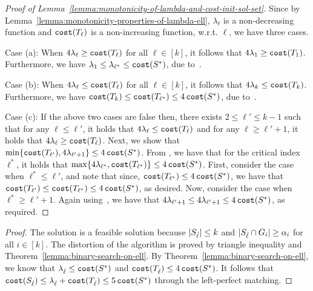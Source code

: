 \monotonicityoflambdacost*
\begin{proof}[Proof of Lemma~\ref{lemma:monotonicity-of-lambda-and-cost-init-sol-set}]
    Since by Lemma~\ref{lemma:monotonicity-properties-of-lambda-ell}, $\lambda_{\ell}$ is a non-de\-creas\-ing function and $\texttt{cost}(T_{\ell})$ is a non-increasing function, w.r.t. $\ell$, we have three cases.
    
    Case (a): When $4 \lambda_{\ell} \geq \texttt{cost}(T_{\ell})$ for all $\ell \in [k]$, it follows that $4 \lambda_{1} \geq \texttt{cost}(T_{1})$.
    Furthermore, we have $\lambda_1 \le \lambda_{\ell^*} \le  \texttt{cost}(S^*)$, due to~.

    Case (b): When $4 \lambda_{\ell} \leq \texttt{cost}(T_{\ell})$ for all $\ell \in [k]$, it follows that $4 \lambda_{k} \leq \texttt{cost}(T_{k})$. 
    Furthermore, we have $\texttt{cost}(T_{k}) \leq \texttt{cost}(T_{\ell^*}) \leq 4\,\texttt{cost}(S^*)$,  due to~.

    Case (c): If the above two cases are false then, there exists $2 \leq \ell' \leq k-1$ such that for any $\ell \leq \ell'$, it holds that $4 \lambda_{\ell} \leq \texttt{cost}(T_{\ell})$ and for any $\ell \geq \ell' + 1$, it holds that $4 \lambda_{\ell} \geq \texttt{cost}(T_{\ell})$.
    Next, we show that $\min \{\texttt{cost}(T_{\ell'}), 4 \lambda_{\ell' + 1}\} \leq 4\,\texttt{cost}(S^*)$. From , we have that for the critical index $\ell^*$, it holds that $\max\{4\lambda_{\ell^*}, \texttt{cost}(T_{\ell^*})\}\leq 4\, \texttt{cost}(S^*)$. First, consider the case when $\ell^* \le \ell'$, and note that since, $ \texttt{cost}(T_{\ell^*}) \leq 4\, \texttt{cost}(S^*)$, we have that $\texttt{cost}(T_{\ell'}) \le  \texttt{cost}(T_{\ell^*})\leq 4\, \texttt{cost}(S^*)$, as desired. Now, consider the case when $\ell^* \geq \ell'+1$. Again using~, we have that $4\lambda_{\ell'+1} \leq 4\lambda_{\ell'+1} \leq 4\, \texttt{cost}(S^*)$, as required.
\end{proof}

\getfeasiblesolution*
\begin{proof}
    The solution is a feasible solution because $\lvert S_{\hat{\ell}} \rvert  \leq k$ and $\lvert S_{\hat{\ell}} \cap G_i \rvert  \geq \alpha_i$ for all $i \in [k]$.
    The distortion of the algorithm is proved by triangle inequality and Theorem~\ref{lemma:binary-search-on-ell}. 
    By Theorem~\ref{lemma:binary-search-on-ell}, we know that $\lambda_{\hat{\ell}} \leq \texttt{cost}(S^*)$ and $\texttt{cost}(T_{\hat{\ell}}) \leq 4\, \texttt{cost}(S^*)$. 
    It follows that $\texttt{cost}(S_{\hat{\ell}}) \leq \lambda_{\hat{\ell}} + \texttt{cost}(T_{\hat{\ell}}) \leq 5\, \texttt{cost}(S^*)$ through the left-perfect matching. 
\end{proof}

